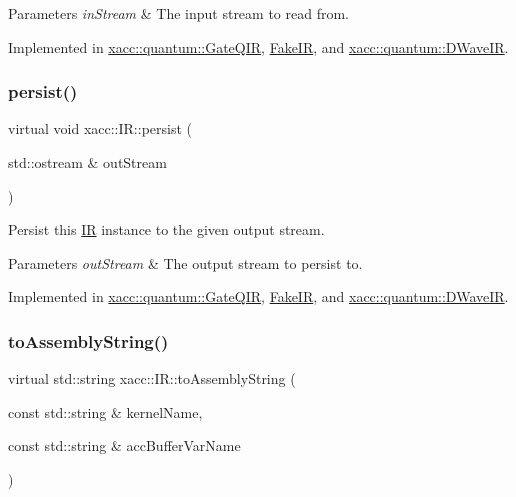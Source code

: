 \begin{DoxyParams}{Parameters}
{\em in\+Stream} & The input stream to read from. \\
\hline
\end{DoxyParams}


Implemented in \hyperlink{a01296_a07f26eeb362ac480d20da6cdc8c8fb39}{xacc\+::quantum\+::\+Gate\+Q\+IR}, \hyperlink{a02492_ad079b5e83c97bc7fae776679e0f93a1e}{Fake\+IR}, and \hyperlink{a01268_a94d814172ec30c7ed32e6ab52bc2a41a}{xacc\+::quantum\+::\+D\+Wave\+IR}.

\mbox{\label{a02480_a414b72224d88473ad6190bb88102a3ea}} 
\subsubsection{\texorpdfstring{persist()}{persist()}}
{\footnotesize\ttfamily virtual void xacc\+::\+I\+R\+::persist (\begin{DoxyParamCaption}\item[{std\+::ostream \&}]{out\+Stream }\end{DoxyParamCaption})\hspace{0.3cm}{\ttfamily [pure virtual]}}

Persist this \hyperlink{a02480}{IR} instance to the given output stream.


\begin{DoxyParams}{Parameters}
{\em out\+Stream} & The output stream to persist to. \\
\hline
\end{DoxyParams}


Implemented in \hyperlink{a01296_a40e1d07e4dfd3794ef53fca3cdbdca61}{xacc\+::quantum\+::\+Gate\+Q\+IR}, \hyperlink{a02492_a459bd7e4a007ab80678df279eb038b51}{Fake\+IR}, and \hyperlink{a01268_adac268c6fa2234902efeb9b3c07c0ac2}{xacc\+::quantum\+::\+D\+Wave\+IR}.

\mbox{\label{a02480_a8356cdff1919b88eabeb84fd7450cdb6}} 
\subsubsection{\texorpdfstring{to\+Assembly\+String()}{toAssemblyString()}}
{\footnotesize\ttfamily virtual std\+::string xacc\+::\+I\+R\+::to\+Assembly\+String (\begin{DoxyParamCaption}\item[{const std\+::string \&}]{kernel\+Name,  }\item[{const std\+::string \&}]{acc\+Buffer\+Var\+Name }\end{DoxyParamCaption})\hspace{0.3cm}{\ttfamily [pure virtual]}}


